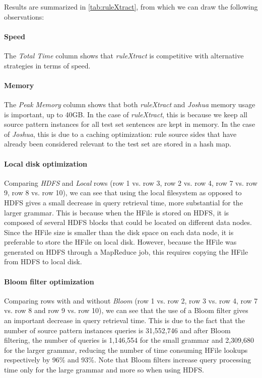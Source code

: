Results are summarized in \autoref{tab:ruleXtract}, from which we can draw the
following observations:
%
\paragraph{Speed} The \emph{Total Time} column shows that \emph{ruleXtract} is
    competitive with alternative strategies in terms of speed.
\paragraph{Memory} The \emph{Peak Memory} column shows that both \emph{ruleXtract} and
    \emph{Joshua} memory usage is important, up to 40GB. In the case of \emph{ruleXtract},
    this is because we keep all source pattern instances for all test set
    sentences are kept in memory. In the case
    of \emph{Joshua}, this is due to a caching optimization: rule source sides
    that have already been considered relevant to the test set are stored
    in a hash map.
\paragraph{Local disk optimization} Comparing \emph{HDFS} and \emph{Local} rows
    (row 1 vs. row 3, row 2 vs. row 4, row 7 vs. row 9, row 8 vs. row 10), we can
    see that using the local filesystem as opposed to HDFS gives a small
    decrease in query retrieval time, more substantial for the larger grammar.
    This is because when the HFile is stored on HDFS, it is composed of several
    HDFS blocks that could be located on different data nodes.
    Since the HFile size is smaller than the disk space on each data node, it is preferable
    to store the HFile on local disk. However, because the HFile was generated on
    HDFS through a MapReduce job, this
    requires copying the HFile from HDFS to
    local disk.
\paragraph{Bloom filter optimization} Comparing rows with and without \emph{Bloom}
    (row 1 vs. row 2, row 3 vs. row 4, row 7 vs. row 8 and row 9 vs. row 10), we can
    see that the
    use of a Bloom filter gives an important decrease in query retrieval time.
    This is due to the fact that the number of source pattern instances queries
    is 31,552,746 and after Bloom filtering, the number of queries is 1,146,554
    for the small grammar and 2,309,680 for the larger grammar, reducing the
    number of time consuming HFile lookups respectively by 96\% and 93\%. Note
    that Bloom filters increase query processing time only for the
    large grammar and more so when using HDFS.

